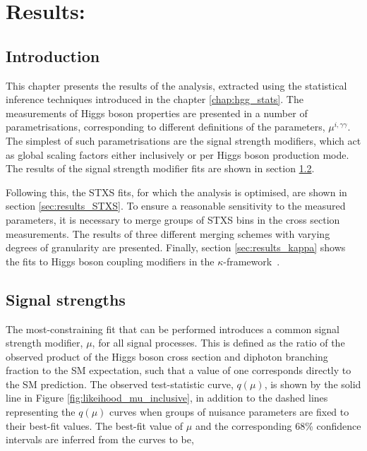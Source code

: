 \chapter{Results: \Hgg}
\label{chap:hgg_results}

\section{Introduction}
This chapter presents the results of the \Hgg analysis, extracted using the statistical inference techniques introduced in the chapter \ref{chap:hgg_stats}. The measurements of Higgs boson properties are presented in a number of parametrisations, corresponding to different definitions of the parameters, $\mu^{i,\gamma\gamma}$. The simplest of such parametrisations are the signal strength modifiers, which act as global scaling factors either inclusively or per Higgs boson production mode. The results of the signal strength modifier fits are shown in section \ref{sec:results_mu}.

Following this, the STXS fits, for which the analysis is optimised, are shown in section \ref{sec:results_STXS}. To ensure a reasonable sensitivity to the measured parameters, it is necessary to merge groups of STXS bins in the cross section measurements. The results of three different merging schemes with varying degrees of granularity are presented. Finally, section \ref{sec:results_kappa} shows the fits to Higgs boson coupling modifiers in the $\kappa$-framework~\cite{Heinemeyer:2013tqa}.

\section{Signal strengths}\label{sec:results_mu}
The most-constraining fit that can be performed introduces a common signal strength modifier, $\mu$, for all signal processes. This is defined as the ratio of the observed product of the Higgs boson cross section and diphoton branching fraction to the SM expectation, such that a value of one corresponds directly to the SM prediction. The observed test-statistic curve, $q(\mu)$, is shown by the solid line in Figure \ref{fig:likeihood_mu_inclusive}, in addition to the dashed lines representing the $q(\mu)$ curves when groups of nuisance parameters are fixed to their best-fit values. The best-fit value of $\mu$ and the corresponding 68\% confidence intervals are inferred from the curves to be,


